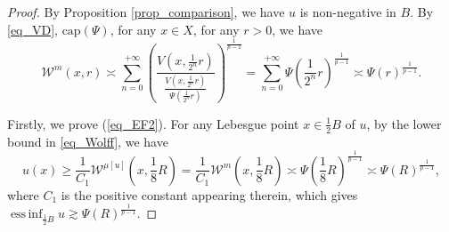 \documentclass[11pt,a4paper]{article}
\numberwithin{equation}{section}
\newcommand{\einf}{\operatorname*{ess\,inf}}
\theoremstyle{plain}
\theoremstyle{definition}
\begin{document}
\begin{proof}
By Proposition \ref{prop_comparison}, we have $u$ is non-negative in $B$. By \ref{eq_VD}, \hyperlink{eq_cap}{$\text{cap}(\Psi)$}, for any $x\in X$, for any $r>0$, we have
$$\mathcal{W}^{m}(x,r)\asymp \sum_{n=0}^{+\infty}\left(\frac{V(x,\frac{1}{2^n}r)}{\frac{V(x,\frac{1}{2^n}r)}{\Psi(\frac{1}{2^n}r)}}\right)^{\frac{1}{p-1}}=\sum_{n=0}^{+\infty}\Psi\left(\frac{1}{2^n}r\right)^{\frac{1}{p-1}}\asymp\Psi(r)^{\frac{1}{p-1}}.$$

Firstly, we prove (\ref{eq_EF2}). For any Lebesgue point $x\in \frac{1}{2}B$ of $u$, by the lower bound in \ref{eq_Wolff}, we have
$$u(x)\ge \frac{1}{C_1}\mathcal{W}^{\mu[u]}\left(x,\frac{1}{8}R\right)=\frac{1}{C_1}\mathcal{W}^{m}\left(x,\frac{1}{8}R\right)\asymp\Psi\left(\frac{1}{8}R\right)^{\frac{1}{p-1}}\asymp \Psi(R)^{\frac{1}{p-1}},$$
where $C_1$ is the positive constant appearing therein, which gives $\einf_{\frac{1}{2}B}u\gtrsim \Psi(R)^{\frac{1}{p-1}}$.


\end{proof}
\end{document}

